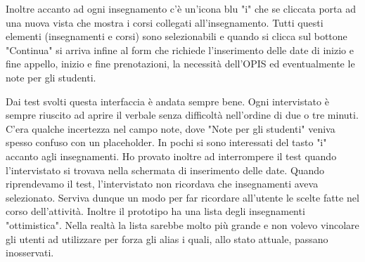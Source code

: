 \documentclass[Lau, oneside]{sapthesis}%
\begin{document}
Inoltre accanto ad ogni insegnamento c'è un'icona blu "i" che se cliccata porta ad una nuova vista che mostra i corsi collegati all'insegnamento. Tutti questi elementi (insegnamenti e corsi) sono selezionabili e quando si clicca sul bottone "Continua" si arriva infine al form che richiede l'inserimento delle date di inizio e fine appello, inizio e fine prenotazioni, la necessità dell'OPIS ed eventualmente le note per gli studenti.

Dai test svolti questa interfaccia è andata sempre bene. Ogni intervistato è sempre riuscito ad aprire il verbale senza difficoltà nell'ordine di due o tre minuti. C'era qualche incertezza nel campo note, dove "Note per gli studenti" veniva spesso confuso con un placeholder. In pochi si sono interessati del tasto "i" accanto agli insegnamenti. Ho provato inoltre ad interrompere il test quando l'intervistato si trovava nella schermata di inserimento delle date. Quando riprendevamo il test, l'intervistato non ricordava che insegnamenti aveva selezionato. Serviva dunque un modo per far ricordare all'utente le scelte fatte nel corso dell'attività. Inoltre il prototipo ha una lista degli insegnamenti "ottimistica". Nella realtà la lista sarebbe molto più grande e non volevo vincolare gli utenti ad utilizzare per forza gli alias i quali, allo stato attuale, passano inosservati.
\end{document}
